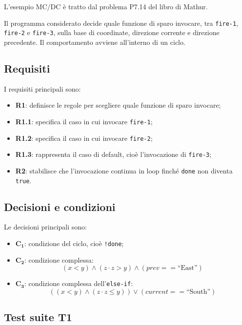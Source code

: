 \begin{notaslide}
L'esempio MC/DC è tratto dal problema P7.14 del libro di Mathur.
\end{notaslide}

Il programma considerato decide quale funzione di sparo invocare, tra \texttt{fire-1}, \texttt{fire-2} e \texttt{fire-3}, sulla base di coordinate, direzione corrente e direzione precedente. Il comportamento avviene all'interno di un ciclo.

\subsection{Requisiti}

I requisiti principali sono:

\begin{itemize}
    \item \textbf{R1}: definisce le regole per scegliere quale funzione di sparo invocare;
    \item \textbf{R1.1}: specifica il caso in cui invocare \texttt{fire-1};
    \item \textbf{R1.2}: specifica il caso in cui invocare \texttt{fire-2};
    \item \textbf{R1.3}: rappresenta il caso di default, cioè l'invocazione di \texttt{fire-3};
    \item \textbf{R2}: stabilisce che l'invocazione continua in loop finché \texttt{done} non diventa \texttt{true}.
\end{itemize}

\subsection{Decisioni e condizioni}

Le decisioni principali sono:

\begin{itemize}
    \item \(\mathbf{C_1}\): condizione del ciclo, cioè \texttt{!done};
    \item \(\mathbf{C_2}\): condizione complessa:
    \[
    (x < y) \land (z \cdot z > y) \land (prev == \text{``East''})
    \]
    \item \(\mathbf{C_3}\): condizione complessa dell'\texttt{else-if}:
    \[
    ((x < y) \land (z \cdot z \leq y)) \lor (current == \text{``South''})
    \]
\end{itemize}

\subsection{Test suite T1}

